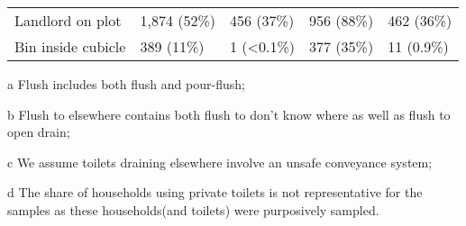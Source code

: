 \begin{table}[ht]
\begin{threeparttable}
{\begin{tabular}[t]{lllll}
Landlord on plot & 1,874 (52\%) & 456 (37\%) & 956 (88\%) & 462 (36\%)\\
Bin inside cubicle & 389 (11\%) & 1 (<0.1\%) & 377 (35\%) & 11 (0.9\%)\\
\bottomrule
\end{tabular}}
\begin{tablenotes}
\item[a] Flush includes both flush and pour-flush;
\item[b] Flush to elsewhere contains both flush to don’t know where as well as flush to open drain; 
\item[c] We assume toilets draining elsewhere involve an unsafe conveyance system;
\item[d] The share of households using private toilets is not representative for the samples as these households\newline(and toilets) were purposively sampled.
\end{tablenotes}
\end{threeparttable}
\end{table}
